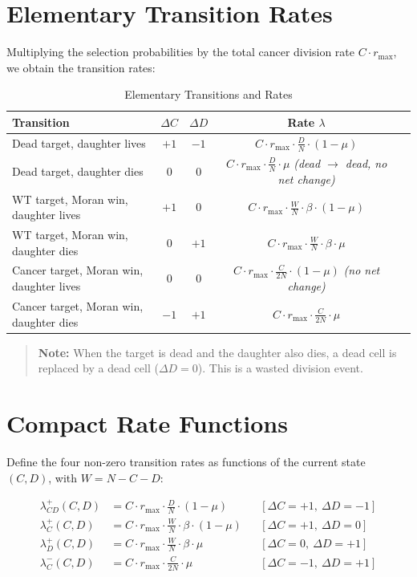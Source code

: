 \documentclass[11pt,a4paper]{article}
\begin{document}
\section{Elementary Transition Rates}

Multiplying the selection probabilities by the total cancer division rate $C \cdot r_{\max}$, we obtain the transition rates:

\begin{table}[h!]
\centering
\caption{Elementary Transitions and Rates}
\begin{tabular}{lcccl}
\toprule
\textbf{Transition} & $\Delta C$ & $\Delta D$ & \textbf{Rate } $\lambda$ \\
\midrule
Dead target, daughter lives & $+1$ & $-1$ & $C \cdot r_{\max} \cdot \frac{D}{N} \cdot (1-\mu)$ \\
Dead target, daughter dies & $0$ & $0$ & $C \cdot r_{\max} \cdot \frac{D}{N} \cdot \mu$ \quad \textit{(dead $\rightarrow$ dead, no net change)} \\
WT target, Moran win, daughter lives & $+1$ & $0$ & $C \cdot r_{\max} \cdot \frac{W}{N} \cdot \beta \cdot (1-\mu)$ \\
WT target, Moran win, daughter dies & $0$ & $+1$ & $C \cdot r_{\max} \cdot \frac{W}{N} \cdot \beta \cdot \mu$ \\
Cancer target, Moran win, daughter lives & $0$ & $0$ & $C \cdot r_{\max} \cdot \frac{C}{2N} \cdot (1-\mu)$ \quad \textit{(no net change)} \\
Cancer target, Moran win, daughter dies & $-1$ & $+1$ & $C \cdot r_{\max} \cdot \frac{C}{2N} \cdot \mu$ \\
\bottomrule
\end{tabular}
\end{table}

\begin{quote}
\textbf{Note:} When the target is dead and the daughter also dies, a dead cell is replaced by a dead cell ($\Delta D = 0$). This is a wasted division event.
\end{quote}

\section{Compact Rate Functions}

Define the four non-zero transition rates as functions of the current state $(C, D)$, with $W = N - C - D$:

\begin{align}
\lambda^+_{CD}(C,D) &= C \cdot r_{\max} \cdot \frac{D}{N} \cdot (1-\mu) && [\Delta C = +1,\ \Delta D = -1] \\
\lambda^+_{C}(C,D)  &= C \cdot r_{\max} \cdot \frac{W}{N} \cdot \beta \cdot (1-\mu) && [\Delta C = +1,\ \Delta D = 0] \\
\lambda^+_{D}(C,D)  &= C \cdot r_{\max} \cdot \frac{W}{N} \cdot \beta \cdot \mu && [\Delta C = 0,\ \Delta D = +1] \\
\lambda^-_{C}(C,D)  &= C \cdot r_{\max} \cdot \frac{C}{2N} \cdot \mu && [\Delta C = -1,\ \Delta D = +1]
\end{align}
\end{document}
